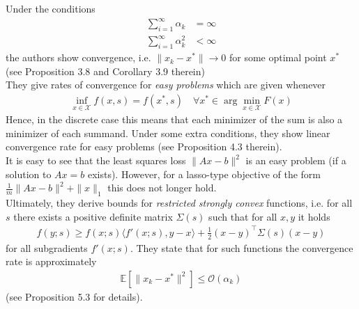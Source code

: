 \documentclass[12pt,a4paper,twoside]{article}
\theoremstyle{plain}
\theoremstyle{note}
\numberwithin{thm}{section}
\newcommand{\onehalf}{\frac{1}{2}}
\begin{document}
	Under the conditions 
	\begin{align*}
	\sum_{i=1}^{\infty} \alpha_k &= \infty \\
	\sum_{i=1}^{\infty} \alpha_k^2 &< \infty 
	\end{align*}
	the authors show convergence, i.e. $\|x_k - x^\ast\| \rightarrow 0$ for some optimal point $x^\ast$ (see Proposition 3.8 and Corollary 3.9 therein)\\
	
	They give rates of convergence for \textit{easy problems} which are given whenever 
	\begin{align*}
		\inf_{x\in \mathcal{X}} f(x,s) = f(x^\ast, s) \quad \forall x^\ast \in \arg \min_{x\in \mathcal{X}}F(x)
	\end{align*}
	Hence, in the discrete case this means that each minimizer of the sum is also a minimizer of each summand. Under some extra conditions, they show linear convergence rate for easy problems (see Proposition 4.3 therein).\\
	
	It is easy to see that the least squares loss $\|Ax-b\|^2$ is an easy problem (if a solution to $Ax=b$ exists). However, for a lasso-type objective of the form $\frac{1}{m}\|Ax-b\|^2 + \|x\|_1$ this does not longer hold.\\
	
	Ultimately, they derive bounds for \textit{restricted strongly convex} functions, i.e. for all $s$ there exists a positive definite matrix $\Sigma(s)$ such that for all $x,y$ it holds 
	\begin{align*}
	 f(y;s) \geq f(x;s) \langle f'(x;s), y-x\rangle + \onehalf (x-y)^\intercal\Sigma(s)(x-y)
	\end{align*}
	for all subgradients $f'(x;s)$.
	They state that for such functions the convergence rate is approximately 
	\begin{align*}
		\mathbb{E}[\|x_k - x^\ast\|^2] \leq \mathcal{O}(\alpha_k)
	\end{align*}
	(see Proposition 5.3 for details).
	
\end{document}

